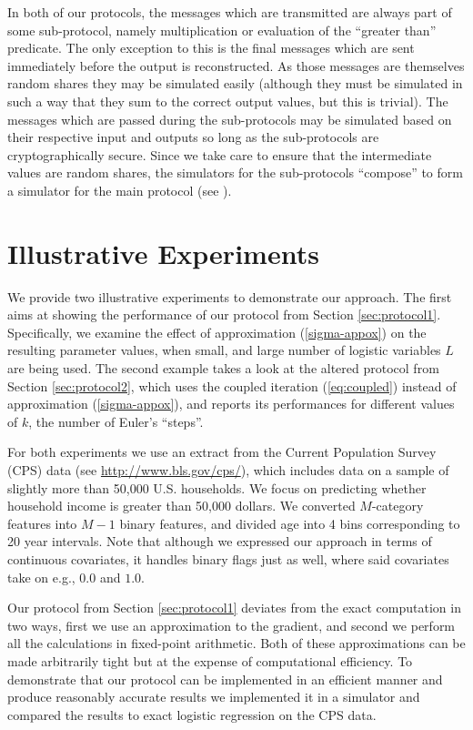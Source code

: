 \documentclass[11pt]{article}
\begin{document}
In both of our protocols, the messages which are transmitted are always part of some sub-protocol, namely multiplication or evaluation of the ``greater than'' predicate.  The only exception to this is the final messages which are sent immediately before the output is reconstructed.  As those messages are themselves random shares they may be simulated easily (although they must be simulated in such a way that they sum to the correct output values, but this is trivial).  The messages which are passed during the sub-protocols may be simulated based on their respective input and outputs so long as the sub-protocols are cryptographically secure.  Since we take care to ensure that the intermediate values are random shares, the simulators for the sub-protocols ``compose'' to form a simulator for the main protocol (see \cite{goldreich}).

\section{Illustrative Experiments}\label{sec:experiment}

We provide two illustrative experiments to demonstrate our approach. The first aims at  showing the performance of our protocol from Section \ref{sec:protocol1}. Specifically, we examine the effect of  approximation (\ref{sigma-appox}) on the resulting parameter values, when small, and large number of logistic variables $L$ are being used. The second example takes a look at the altered protocol from Section \ref{sec:protocol2}, which uses the coupled iteration (\ref{eq:coupled}) instead of approximation (\ref{sigma-appox}), and reports its performances for different values of $k$, the number of Euler's ``steps''.

For both experiments we use an extract from the Current Population Survey (CPS) data (see \url{http://www.bls.gov/cps/}), which includes data on a sample of slightly more than  50,000 U.S. households.  We focus on predicting whether  household income is greater than 50,000 dollars.  We converted $M$-category features into $M-1$ binary features, and divided age into 4 bins corresponding to 20 year intervals.  Note that although we expressed our approach in terms of continuous covariates, it handles binary flags just as well, where said covariates take on e.g., $0.0$ and $1.0$.

Our protocol from Section \ref{sec:protocol1} deviates from the exact computation in two ways, first we use an approximation to the gradient, and second we perform all the calculations in fixed-point arithmetic.  Both of these approximations can be made arbitrarily tight but at the expense of computational efficiency.  To demonstrate that our protocol can be implemented in an efficient manner and produce reasonably accurate results we implemented it in a simulator and compared the results to exact logistic regression on the CPS data.
\end{document}
